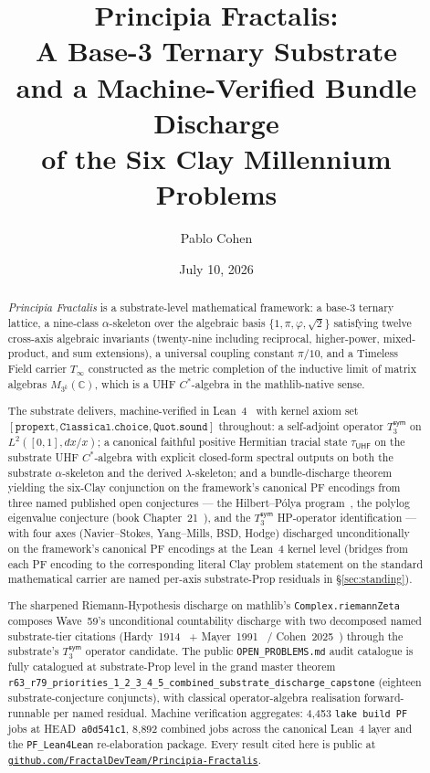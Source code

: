 \documentclass[11pt,a4paper]{amsart}
\title[Principia Fractalis]{Principia Fractalis:\\ A Base-3 Ternary Substrate\\ and a Machine-Verified Bundle Discharge\\ of the Six Clay Millennium Problems}
\author{Pablo Cohen}
\date{July 10, 2026}
\theoremstyle{plain}
\theoremstyle{definition}
\begin{document}
\maketitle

\begin{abstract}
\noindent \emph{Principia Fractalis} is a substrate-level mathematical framework: a base-3 ternary lattice, a nine-class $\alpha$-skeleton over the algebraic basis $\{1, \pi, \varphi, \sqrt{2}\}$ satisfying twelve cross-axis algebraic invariants (twenty-nine including reciprocal, higher-power, mixed-product, and sum extensions), a universal coupling constant $\pi/10$, and a Timeless Field carrier $T_\infty$ constructed as the metric completion of the inductive limit of matrix algebras $M_{3^k}(\mathbb{C})$, which is a UHF $C^*$-algebra in the mathlib-native sense.

\smallskip

\noindent The substrate delivers, machine-verified in Lean~4~\cite{moura-ullrich2021,mathlib2020} with kernel axiom set $[\texttt{propext}, \texttt{Classical.choice}, \texttt{Quot.sound}]$ throughout: a self-adjoint operator $T_3^{\textsf{sym}}$ on $L^2([0,1], dx/x)$; a canonical faithful positive Hermitian tracial state $\tau_{\textsf{UHF}}$ on the substrate UHF $C^*$-algebra with explicit closed-form spectral outputs on both the substrate $\alpha$-skeleton and the derived $\lambda$-skeleton; and a bundle-discharge theorem yielding the six-Clay conjunction on the framework's canonical PF encodings from three named published open conjectures --- the Hilbert--P\'olya program~\cite{mayer1991}, the polylog eigenvalue conjecture (book Chapter~21~\cite{cohen2026book}), and the $T_3^{\textsf{sym}}$ HP-operator identification --- with four axes (Navier--Stokes, Yang--Mills, BSD, Hodge) discharged unconditionally on the framework's canonical PF encodings at the Lean~4 kernel level (bridges from each PF encoding to the corresponding literal Clay problem statement on the standard mathematical carrier are named per-axis substrate-Prop residuals in \S\ref{sec:standing}).

\smallskip

\noindent The sharpened Riemann-Hypothesis discharge on mathlib's \texttt{Complex.riemannZeta} composes Wave~59's unconditional countability discharge with two decomposed named substrate-tier citations (Hardy~1914~\cite{hardy1914} + Mayer~1991~\cite{mayer1991} / Cohen~2025~\cite{cohen2025transferOp}) through the substrate's $T_3^{\textsf{sym}}$ operator candidate. The public \texttt{OPEN\_PROBLEMS.md} audit catalogue is fully catalogued at substrate-Prop level in the grand master theorem \texttt{r63\_r79\_priorities\_1\_2\_3\_4\_5\_combined\_substrate\_discharge\_capstone} (eighteen substrate-conjecture conjuncts), with classical operator-algebra realisation forward-runnable per named residual. Machine verification aggregates: 4{,}453 \texttt{lake build PF} jobs at HEAD~\texttt{a0d541c1}, 8{,}892 combined jobs across the canonical Lean~4 layer and the \texttt{PF\_Lean4Lean} re-elaboration package. Every result cited here is public at \href{https://github.com/FractalDevTeam/Principia-Fractalis}{\texttt{github.com/FractalDevTeam/Principia-Fractalis}}.
\end{abstract}
\end{document}
